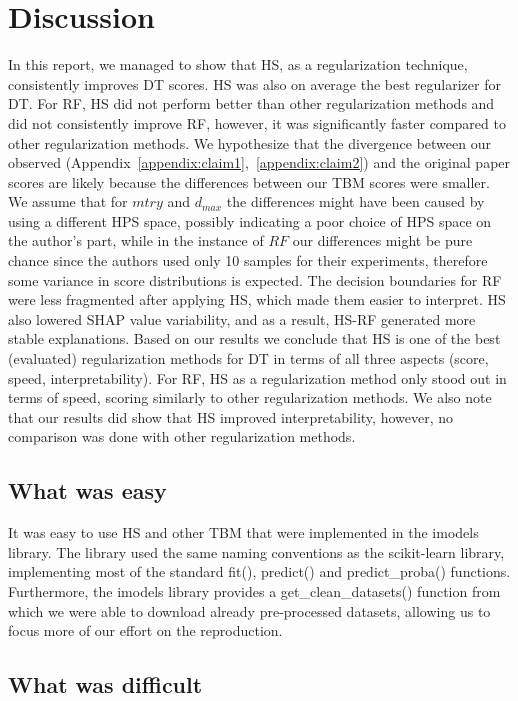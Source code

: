 \section{Discussion}

In this report, we managed to show that HS, as a regularization technique, consistently improves DT scores. HS was also on average the best regularizer for DT. 
For RF, HS did not perform better than other regularization methods and did not consistently improve RF, however, it was significantly faster compared to other regularization methods.
We hypothesize that the divergence between our observed (Appendix~\ref{appendix:claim1},~\ref{appendix:claim2}) and the original paper scores are likely because the differences between our TBM scores were smaller.
We assume that for $mtry$ and $d_{max}$ the differences might have been caused by using a different HPS space, possibly indicating a poor choice of HPS space on the author's part, while in the instance of $RF$ our differences might be pure chance since the authors used only 10 samples for their experiments, therefore some variance in score distributions is expected.
The decision boundaries for RF were less fragmented after applying HS, which made them easier to interpret. HS also lowered SHAP value variability, and as a result, HS-RF generated more stable explanations. 
Based on our results we conclude that HS is one of the best (evaluated) regularization methods for DT in terms of all three aspects (score, speed, interpretability).
For RF, HS as a regularization method only stood out in terms of speed, scoring similarly to other regularization methods.
We also note that our results did show that HS improved interpretability, however, no comparison was done with other regularization methods.

\subsection{What was easy}

It was easy to use HS and other TBM that were implemented in the {\sf imodels} library.
The library used the same naming conventions as the {\sf scikit-learn} library, implementing most of the standard {\sf fit()}, {\sf predict()} and {\sf predict\_proba()} functions.
Furthermore, the {\sf imodels} library provides a {\sf get\_clean\_datasets()} function from which we were able to download already pre-processed datasets, allowing us to focus more of our effort on the reproduction.

\subsection{What was difficult}

